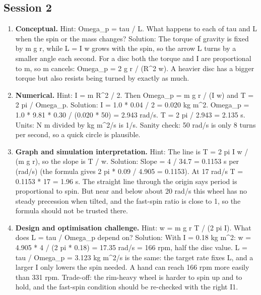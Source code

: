 \documentclass[11pt,a4paper]{article}
\begin{document}
\subsection*{Session 2}
\begin{enumerate}[nosep]
\item \textbf{Conceptual.} Hint: Omega\_p = tau / L. What happens to each of tau and L when the spin or the mass changes? Solution: The torque of gravity is fixed by m g r, while L = I w grows with the spin, so the arrow L turns by a smaller angle each second. For a disc both the torque and I are proportional to m, so m cancels: Omega\_p = 2 g r / (R\textasciicircum{}2 w). A heavier disc has a bigger torque but also resists being turned by exactly as much.
\item \textbf{Numerical.} Hint: I = m R\textasciicircum{}2 / 2. Then Omega\_p = m g r / (I w) and T = 2 pi / Omega\_p. Solution: I = 1.0 * 0.04 / 2 = 0.020 kg m\textasciicircum{}2. Omega\_p = 1.0 * 9.81 * 0.30 / (0.020 * 50) = 2.943 rad/s. T = 2 pi / 2.943 = 2.135 s. Units: N m divided by kg m\textasciicircum{}2/s is 1/s. Sanity check: 50 rad/s is only 8 turns per second, so a quick circle is plausible.
\item \textbf{Graph and simulation interpretation.} Hint: The line is T = 2 pi I w / (m g r), so the slope is T / w. Solution: Slope = 4 / 34.7 = 0.1153 s per (rad/s) (the formula gives 2 pi * 0.09 / 4.905 = 0.1153). At 17 rad/s T = 0.1153 * 17 = 1.96 s. The straight line through the origin says period is proportional to spin. But near and below about 20 rad/s this wheel has no steady precession when tilted, and the fast-spin ratio is close to 1, so the formula should not be trusted there.
\item \textbf{Design and optimisation challenge.} Hint: w = m g r T / (2 pi I). What does L = tau / Omega\_p depend on? Solution: With I = 0.18 kg m\textasciicircum{}2: w = 4.905 * 4 / (2 pi * 0.18) = 17.35 rad/s = 166 rpm, half the disc value. L = tau / Omega\_p = 3.123 kg m\textasciicircum{}2/s is the same: the target rate fixes L, and a larger I only lowers the spin needed. A hand can reach 166 rpm more easily than 331 rpm. Trade-off: the rim-heavy wheel is harder to spin up and to hold, and the fast-spin condition should be re-checked with the right I1.
\end{enumerate}
\end{document}
